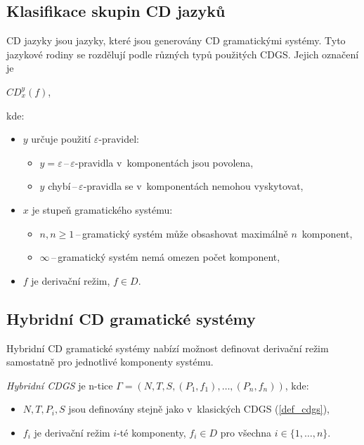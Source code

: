 \subsection*{Klasifikace skupin CD jazyků}
CD jazyky jsou jazyky, které jsou generovány CD gramatickými systémy.
Tyto jazykové rodiny se rozdělují podle různých typů použitých CDGS.
Jejich označení je
\begin{center}
    $CD^y_x(f)$,
\end{center}
kde:
\begin{itemize}
    \item $y$ určuje použití $\varepsilon$-pravidel: 
    \begin{itemize}[label=$\circ$]
        \item $y = \varepsilon$\,--\,$\varepsilon$-pravidla v~komponentách jsou povolena,
        \item $y$ chybí\,--\,$\varepsilon$-pravidla se v~komponentách nemohou vyskytovat,
    \end{itemize}
    \item $x$ je stupeň gramatického systému:
    \begin{itemize}[label=$\circ$]
        \item $n, n \geq 1$\,--\,gramatický systém může obsashovat maximálně $n$~komponent,
        \item $\infty$\,--\,gramatický systém nemá omezen počet komponent,
    \end{itemize}
    \item $f$ je derivační režim, $f \in D$.
\end{itemize}

\subsection*{Hybridní CD gramatické systémy}
Hybridní CD gramatické systémy nabízí možnost definovat derivační režim samostatně pro jednotlivé komponenty systému.
\begin{definition}
    \emph{Hybridní CDGS} je n-tice $\Gamma = (N, T, S, (P_1, f_1), \ldots, (P_n, f_n))$, kde:
    \begin{itemize}
        \item $N, T, P_i, S$ jsou definovány stejně jako v~klasických CDGS (\ref{def_cdgs}),
        \item $f_i$ je derivační režim $i$-té komponenty, $f_i \in D$ pro všechna $i \in \{1, \ldots, n\}$.
    \end{itemize}
\end{definition}

